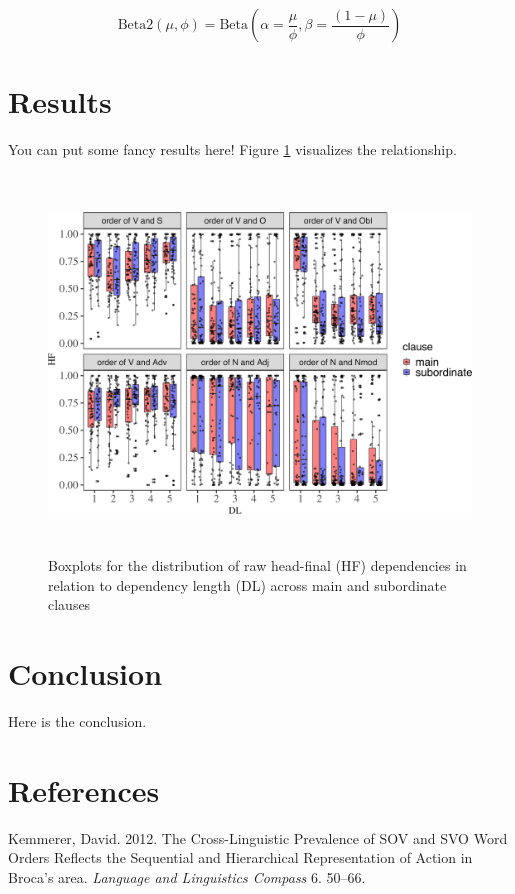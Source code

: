 \documentclass[10pt,a4paper,]{article}
\begin{document}
\begin{equation*}
\text{Beta2} \left(\mu, \phi \right) = \text{Beta} \left(\alpha = \frac{\mu}{\phi}, \beta = \frac{\left(1 - \mu \right)}{\phi} \right)
\end{equation*}

\section{Results}\label{results}

You can put some fancy results here! Figure \ref{fig-raw-dist}
visualizes the relationship.

\captionsetup{margin=1cm}

\begin{figure}[htpb]
\centering
\includegraphics[width=14cm, height=10cm]{figures/relationship between DL and HF-1.pdf}
\caption{Boxplots for the distribution of raw head-final (HF) dependencies in relation to dependency length (DL) across main and subordinate clauses} 
\label{fig-raw-dist}
\end{figure}

\section{Conclusion}\label{conclusion}

Here is the conclusion. \setlength{\parskip}{0pt} \raggedright
{}

\section*{References}\label{references}

\hypertarget{refs}{}
\hypertarget{ref-Kemmerer2012}{}
Kemmerer, David. 2012. The Cross-Linguistic Prevalence of SOV and SVO
Word Orders Reflects the Sequential and Hierarchical Representation of
Action in Broca's area. \emph{Language and Linguistics Compass} 6.
50--66.

\end{document}
